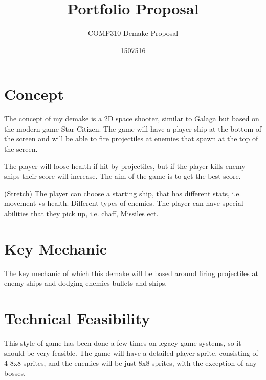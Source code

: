 \documentclass{scrartcl}
\title{Portfolio Proposal}
\subtitle{COMP310 Demake-Proposal}
\author{1507516}
\begin{document}
\maketitle

\abstract{}

\section{Concept}
The concept of my demake is a 2D space shooter, similar to Galaga but based on the modern game Star Citizen.
The game will have a player ship at the bottom of the screen and will be able to fire projectiles at enemies that spawn at the top of the screen.

The player will loose health if hit by projectiles, but if the player kills enemy ships their score will increase.
The aim of the game is to get the best score.

(Stretch)
The player can choose a starting ship, that has different stats, i.e. movement vs health.
Different types of enemies.
The player can have special abilities that they pick up, i.e. chaff, Missiles ect.



\section{Key Mechanic}
The key mechanic of which this demake will be based around firing projectiles at enemy ships and dodging enemies bullets and ships.


\section{Technical Feasibility}
This style of game has been done a few times on legacy game systems, so it should be very feasible.
The game will have a detailed player sprite, consisting of 4 8x8 sprites, and the enemies will be just 8x8 sprites, with the exception of any bosses.
\end{document}
